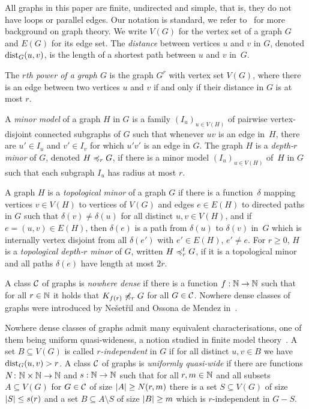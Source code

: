 All graphs in this paper are finite, undirected and simple, that is, 
they do not have loops or parallel edges. Our notation is standard,
we refer to~\cite{diestel2012graph} for more background on 
graph theory. 
We write $V(G)$ for the vertex set of a graph $G$ and
$E(G)$ for its edge set. 
The {\em{distance}} between vertices $u$ and $v$ in $G$, denoted $\mathrm{dist}_G(u,v)$, is the length of a shortest path between $u$ and $v$ in~$G$.

The \emph{$r$th power of a graph $G$} is the graph $G^r$
with vertex set $V(G)$, where there is an edge between two 
vertices $u$ and $v$ if and only if their distance in $G$ is at most $r$. 

A {\em{minor model}} of a graph $H$ in $G$ is a family $(I_u)_{u\in V(H)}$ of pairwise vertex-disjoint connected subgraphs of $G$
such that whenever $uv$ is an edge in~$H$, there are $u'\in I_u$ and $v'\in I_v$ for which $u'v'$ 
is an edge in $G$.
The graph $H$ is a {\em{depth-$r$ minor}} of $G$, denoted $H\preccurlyeq_rG$, if there is a minor model
$(I_u)_{u\in V(H)}$ of~$H$ in $G$ such that each subgraph $I_u$ has radius at most $r$.

A graph $H$ is a \emph{topological minor} of a graph $G$ if there is a
function~$\delta$ mapping vertices $v\in V(H)$ to vertices of $V(G)$ and 
edges $e\in E(H)$ to directed paths in $G$ such that 
$\delta(v)\neq \delta(u)$ for all distinct $u,v\in V(H)$, and 
if $e=(u,v)\in E(H)$, then $\delta(e)$ is a path from 
$\delta(u)$ to $\delta(v)$ in~$G$ which is internally vertex disjoint from all 
$\delta(e')$ with $e'\in E(H)$, $e'\neq e$. 
For $r\geq 0$, $H$ is a \emph{topological depth-$r$ minor} of $G$, 
written $H\preccurlyeq_r^tG$, if it is a topological minor and all paths $\delta(e)$
have length at most $2r$. 

A class $\mathcal{C}$ of graphs is \emph{nowhere dense} if there is a function 
$f:\mathbb{N}\rightarrow \mathbb{N}$ such that for all $r\in \mathbb{N}$ it holds that $K_{f(r)}\not\preccurlyeq_r G$
for all $G\in \mathcal{C}$. Nowhere dense classes of graphs were introduced by
Ne\v{s}et\v{r}il and Ossona de Mendez in~\cite{nevsetvril2010first,nevsetvril2011nowhere}.

Nowhere dense classes of graphs admit many equivalent characterisations, 
one of them being uniform quasi-wideness, a notion studied in 
finite model theory~\cite{dawar2010homomorphism}.  
A set $B\subseteq V(G)$ is called {\em{$r$-independent}} in $G$ if for all
distinct $u,v\in B$ we have $\mathrm{dist}_G(u,v)>r$.
A class $\mathcal{C}$ of graphs is \emph{uniformly quasi-wide} if there are
functions $N\colon \mathbb{N}\times\mathbb{N}\rightarrow \mathbb{N}$ and $s:\mathbb{N}\rightarrow \mathbb{N}$ such
that for all $r,m\in \mathbb{N}$ and all subsets $A\subseteq V(G)$ for
$G\in \mathcal{C}$ of size $\left\lvert A\right\rvert\geq N(r,m)$ there is a set
$S\subseteq V(G)$ of size $\left\lvert S\right\rvert\leq s(r)$ and a set
$B\subseteq A\setminus S$ of size $\left\lvert B\right\rvert\geq m$ which is $r$-independent in
$G-S$. 

